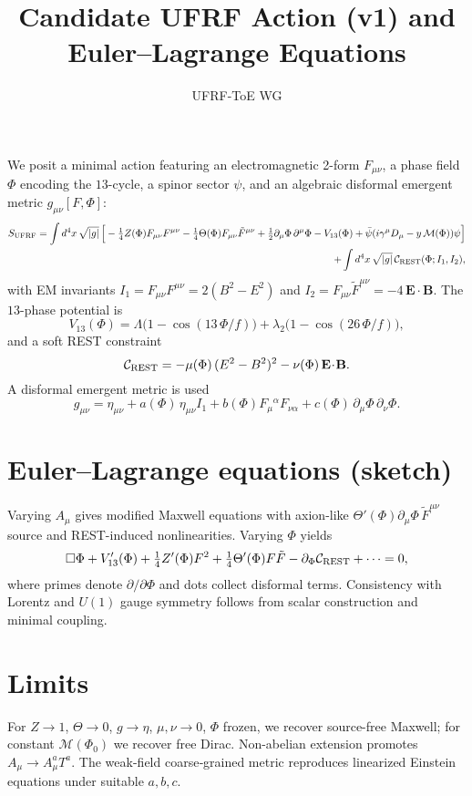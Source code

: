 \documentclass[11pt]{article}
\title{Candidate UFRF Action (v1) and Euler--Lagrange Equations}
\author{UFRF-ToE WG}
\begin{document}
\maketitle

We posit a minimal action featuring an electromagnetic 2-form $F_{\mu\nu}$, a phase field $\Phi$ encoding the $13$-cycle, a spinor sector $\psi$, and an algebraic disformal emergent metric $g_{\mu\nu}[F,\Phi]$:
\begin{align}
S_{\text{UFRF}}=\int d^4x\,\sqrt{|g|}\,\Big[
-\tfrac14 Z(\Phi) F_{\mu\nu}F^{\mu\nu}
-\tfrac14 \Theta(\Phi) F_{\mu\nu}\tilde F^{\mu\nu}
+\tfrac12 \partial_\mu\Phi\,\partial^\mu\Phi
- V_{13}(\Phi)
+ \bar\psi(i\gamma^\mu D_\mu - y\,\mathcal M(\Phi))\psi
\Big]
\\
+ \int d^4x\,\sqrt{|g|}\,\mathcal C_{\rm REST}(\Phi; I_1, I_2),
\end{align}
with EM invariants $I_1 = F_{\mu\nu}F^{\mu\nu}=2(B^2-E^2)$ and $I_2=F_{\mu\nu}\tilde F^{\mu\nu}=-4\,\mathbf E\cdot\mathbf B$. The $13$-phase potential is
\begin{equation}
V_{13}(\Phi)=\Lambda\big(1-\cos(13\,\Phi/f)\big)+\lambda_2\big(1-\cos(26\,\Phi/f)\big),
\end{equation}
and a soft REST constraint
\begin{equation}
\mathcal C_{\rm REST} = -\mu(\Phi)\,(E^2-B^2)^2 - \nu(\Phi)\,\mathbf E\!\cdot\!\mathbf B.
\end{equation}
A disformal emergent metric is used
\begin{equation}
g_{\mu\nu}=\eta_{\mu\nu}+a(\Phi)\,\eta_{\mu\nu} I_1 + b(\Phi)F_\mu{}^{\alpha} F_{\nu\alpha} + c(\Phi)\,\partial_\mu\Phi\,\partial_\nu\Phi.
\end{equation}

\section*{Euler--Lagrange equations (sketch)}
Varying $A_\mu$ gives modified Maxwell equations with axion-like $\Theta'(\Phi)\partial_\mu\Phi\,\tilde F^{\mu\nu}$ source and REST-induced nonlinearities. Varying $\Phi$ yields
\begin{equation}
\Box\Phi + V_{13}'(\Phi) + \tfrac14 Z'(\Phi)F^2 + \tfrac14 \Theta'(\Phi)F\tilde F - \partial_\Phi \mathcal C_{\rm REST} + \cdots = 0,
\end{equation}
where primes denote $\partial/\partial\Phi$ and dots collect disformal terms.
Consistency with Lorentz and $U(1)$ gauge symmetry follows from scalar construction and minimal coupling.

\section*{Limits}
For $Z\!\to\!1$, $\Theta\!\to\!0$, $g\!\to\!\eta$, $\mu,\nu\!\to\!0$, $\Phi$ frozen, we recover source-free Maxwell; for constant $\mathcal M(\Phi_0)$ we recover free Dirac. Non-abelian extension promotes $A_\mu\to A_\mu^a T^a$. The weak-field coarse‑grained metric reproduces linearized Einstein equations under suitable $a,b,c$.
\end{document}
